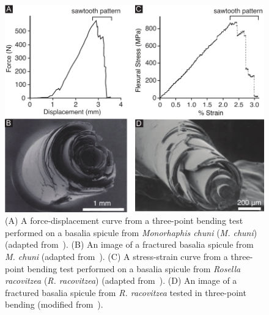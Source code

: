 

\begin{figure}[ht]
\centering
\includegraphics[width=\textwidth]{Figures/Figure2_V7.pdf}
\caption{(\textsf{A}) A force-displacement curve from a three-point bending test performed on a basalia spicule from \textit{Monorhaphis chuni} (\textit{M. chuni})  (adapted from~\cite{levi1989remarkably}). (\textsf{B}) An image of a fractured basalia spicule from \textit{M. chuni} (adapted from~\cite{levi1989remarkably}). (\textsf{C}) A stress-strain curve from a three-point bending test performed on a basalia spicule from \textit{Rosella racovitzea} (\textit{R. racovitzea}) (adapted from~\cite{sarikaya2001biomimetic}). (\textsf{D}) An image of a fractured basalia spicule from \textit{R. racovitzea} tested in three-point bending (modified from~\cite{sarikaya2001biomimetic}). }
\label{fig:sawtoothlit}
\end{figure}
